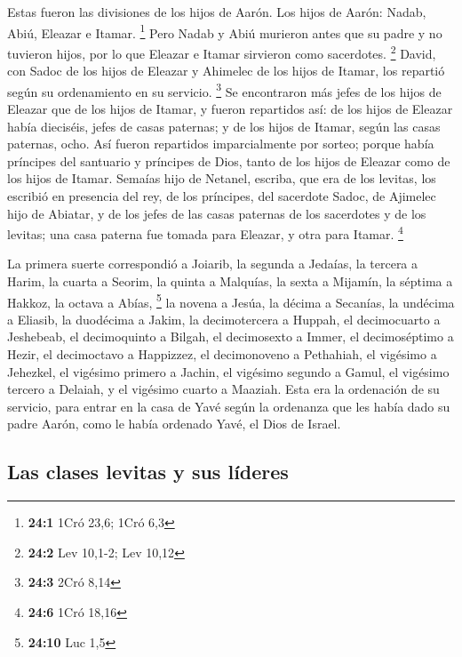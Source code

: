 Estas fueron las divisiones de los hijos de Aarón. Los
hijos de Aarón: Nadab, Abiú, Eleazar e Itamar. \footnote{\textbf{24:1}
  1Cró 23,6; 1Cró 6,3}  Pero Nadab y Abiú murieron antes
que su padre y no tuvieron hijos, por lo que Eleazar e Itamar sirvieron
como sacerdotes. \footnote{\textbf{24:2} Lev 10,1-2; Lev 10,12}
 David, con Sadoc de los hijos de Eleazar y Ahimelec de
los hijos de Itamar, los repartió según su ordenamiento en su servicio.
\footnote{\textbf{24:3} 2Cró 8,14}  Se encontraron más
jefes de los hijos de Eleazar que de los hijos de Itamar, y fueron
repartidos así: de los hijos de Eleazar había dieciséis, jefes de casas
paternas; y de los hijos de Itamar, según las casas paternas, ocho.
 Así fueron repartidos imparcialmente por sorteo; porque
había príncipes del santuario y príncipes de Dios, tanto de los hijos de
Eleazar como de los hijos de Itamar.  Semaías hijo de
Netanel, escriba, que era de los levitas, los escribió en presencia del
rey, de los príncipes, del sacerdote Sadoc, de Ajimelec hijo de Abiatar,
y de los jefes de las casas paternas de los sacerdotes y de los levitas;
una casa paterna fue tomada para Eleazar, y otra para Itamar.
\footnote{\textbf{24:6} 1Cró 18,16}

 La primera suerte correspondió a Joiarib, la segunda a
Jedaías,  la tercera a Harim, la cuarta a Seorim,
 la quinta a Malquías, la sexta a Mijamín, 
la séptima a Hakkoz, la octava a Abías, \footnote{\textbf{24:10} Luc 1,5}
 la novena a Jesúa, la décima a Secanías, 
la undécima a Eliasib, la duodécima a Jakim,  la
decimotercera a Huppah, el decimocuarto a Jeshebeab,  el
decimoquinto a Bilgah, el decimosexto a Immer,  el
decimoséptimo a Hezir, el decimoctavo a Happizzez,  el
decimonoveno a Pethahiah, el vigésimo a Jehezkel,  el
vigésimo primero a Jachin, el vigésimo segundo a Gamul, 
el vigésimo tercero a Delaiah, y el vigésimo cuarto a Maaziah.
 Esta era la ordenación de su servicio, para entrar en la
casa de Yavé según la ordenanza que les había dado su padre Aarón, como
le había ordenado Yavé, el Dios de Israel.

\hypertarget{las-clases-levitas-y-sus-luxedderes}{%
\subsection{Las clases levitas y sus
líderes}\label{las-clases-levitas-y-sus-luxedderes}}

